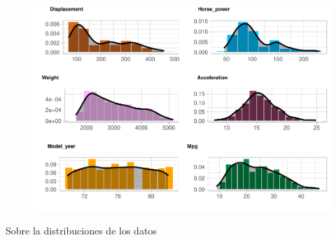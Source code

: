 \begin{figure}[H]\includegraphics[width=.9\linewidth]{img/EDA_files/figure-latex/unnamed-chunk-7-7} \caption{}\end{figure}

Sobre la distribuciones de los datos


